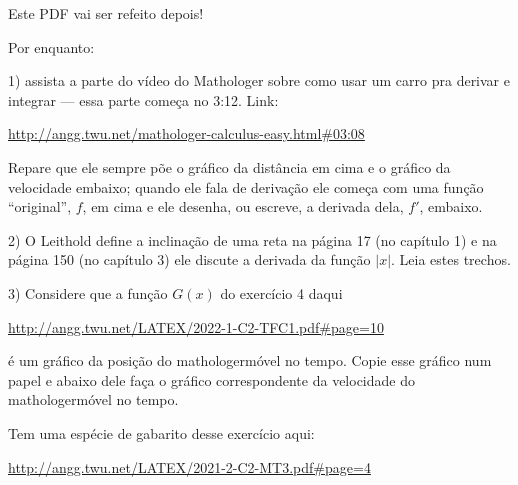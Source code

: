 \documentclass[oneside,12pt]{article}
\begin{document}
\newpage

Este PDF vai ser refeito depois!

Por enquanto:

\msk

1) assista a parte do vídeo do Mathologer sobre como usar um carro pra
derivar e integrar --- essa parte começa no 3:12. Link:

\ssk

{\footnotesize

\url{http://angg.twu.net/mathologer-calculus-easy.html\#03:08}

}

\ssk

Repare que ele sempre põe o gráfico da distância em cima e o gráfico
da velocidade embaixo; quando ele fala de derivação ele começa com uma
função ``original'', $f$, em cima e ele desenha, ou escreve, a
derivada dela, $f'$, embaixo.

\msk

2) O Leithold define a inclinação de uma reta na página 17 (no
capítulo 1) e na página 150 (no capítulo 3) ele discute a derivada da
função $|x|$. Leia estes trechos.


\newpage


3) Considere que a função $G(x)$ do exercício 4 daqui

\ssk

{\footnotesize

\url{http://angg.twu.net/LATEX/2022-1-C2-TFC1.pdf#page=10}

}

\ssk

é um gráfico da posição do mathologermóvel no tempo. Copie esse
gráfico num papel e abaixo dele faça o gráfico correspondente da
velocidade do mathologermóvel no tempo.

\msk

Tem uma espécie de gabarito desse exercício aqui:

\ssk

{\footnotesize

\url{http://angg.twu.net/LATEX/2021-2-C2-MT3.pdf#page=4}

}
\end{document}
